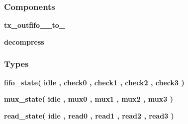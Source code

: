 \subsubsection*{Components}
 \begin{DoxyCompactItemize}
\item 
{\bf tx\+\_\+outfifo\+\_\+\_\+to\+\_}  {\bfseries }  
\item 
{\bf decompress}  {\bfseries }  
\end{DoxyCompactItemize}
\subsubsection*{Types}
 \begin{DoxyCompactItemize}
\item 
{\bfseries {\bf fifo\+\_\+state}{\bfseries \textcolor{vhdlchar}{(}\textcolor{vhdlchar}{ }\textcolor{vhdlchar}{idle}\textcolor{vhdlchar}{ }\textcolor{vhdlchar}{,}\textcolor{vhdlchar}{ }\textcolor{vhdlchar}{check0}\textcolor{vhdlchar}{ }\textcolor{vhdlchar}{,}\textcolor{vhdlchar}{ }\textcolor{vhdlchar}{check1}\textcolor{vhdlchar}{ }\textcolor{vhdlchar}{,}\textcolor{vhdlchar}{ }\textcolor{vhdlchar}{check2}\textcolor{vhdlchar}{ }\textcolor{vhdlchar}{,}\textcolor{vhdlchar}{ }\textcolor{vhdlchar}{check3}\textcolor{vhdlchar}{ }\textcolor{vhdlchar}{)}\textcolor{vhdlchar}{ }}} 
\item 
{\bfseries {\bf mux\+\_\+state}{\bfseries \textcolor{vhdlchar}{(}\textcolor{vhdlchar}{ }\textcolor{vhdlchar}{idle}\textcolor{vhdlchar}{ }\textcolor{vhdlchar}{,}\textcolor{vhdlchar}{ }\textcolor{vhdlchar}{mux0}\textcolor{vhdlchar}{ }\textcolor{vhdlchar}{,}\textcolor{vhdlchar}{ }\textcolor{vhdlchar}{mux1}\textcolor{vhdlchar}{ }\textcolor{vhdlchar}{,}\textcolor{vhdlchar}{ }\textcolor{vhdlchar}{mux2}\textcolor{vhdlchar}{ }\textcolor{vhdlchar}{,}\textcolor{vhdlchar}{ }\textcolor{vhdlchar}{mux3}\textcolor{vhdlchar}{ }\textcolor{vhdlchar}{)}\textcolor{vhdlchar}{ }}} 
\item 
{\bfseries {\bf read\+\_\+state}{\bfseries \textcolor{vhdlchar}{(}\textcolor{vhdlchar}{ }\textcolor{vhdlchar}{idle}\textcolor{vhdlchar}{ }\textcolor{vhdlchar}{,}\textcolor{vhdlchar}{ }\textcolor{vhdlchar}{read0}\textcolor{vhdlchar}{ }\textcolor{vhdlchar}{,}\textcolor{vhdlchar}{ }\textcolor{vhdlchar}{read1}\textcolor{vhdlchar}{ }\textcolor{vhdlchar}{,}\textcolor{vhdlchar}{ }\textcolor{vhdlchar}{read2}\textcolor{vhdlchar}{ }\textcolor{vhdlchar}{,}\textcolor{vhdlchar}{ }\textcolor{vhdlchar}{read3}\textcolor{vhdlchar}{ }\textcolor{vhdlchar}{)}\textcolor{vhdlchar}{ }}} 

\end{DoxyCompactItemize}
